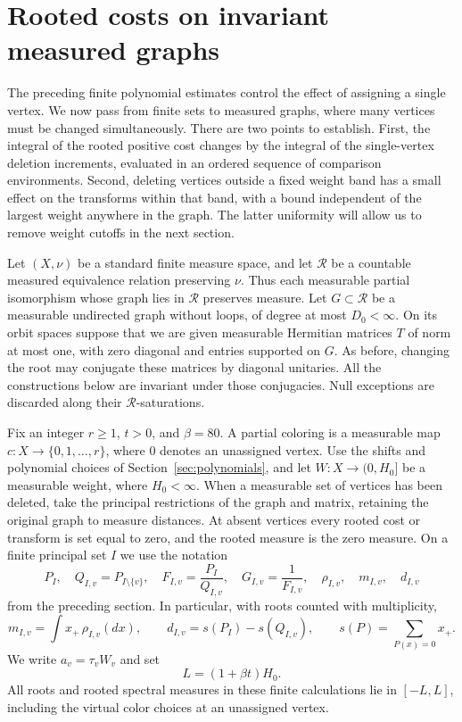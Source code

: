 \section{Rooted costs on invariant measured graphs}\label{sec:invariant}

The preceding finite polynomial estimates control the effect of assigning a
single vertex.  We now pass from finite sets to measured graphs, where many
vertices must be changed simultaneously.  There are two points to establish.
First, the integral of the rooted positive cost changes by the integral of the
single-vertex deletion increments, evaluated in an ordered sequence of
comparison environments.  Second, deleting vertices outside a fixed weight
band has a small effect on the transforms within that band, with a bound
independent of the largest weight anywhere in the graph.  The latter
uniformity will allow us to remove weight cutoffs in the next section.

Let $(X,\nu)$ be a standard finite measure space, and let $\mathcal R$ be a
countable measured equivalence relation preserving $\nu$.  Thus each
measurable partial isomorphism whose graph lies in $\mathcal R$ preserves
measure.  Let $G\subset\mathcal R$ be a measurable undirected graph without
loops, of degree at most $D_0<\infty$.  On its orbit spaces suppose that we are
given measurable Hermitian matrices $T$ of norm at most one, with zero
diagonal and entries supported on $G$.  As before, changing the root may
conjugate these matrices by diagonal unitaries.  All the constructions below
are invariant under those conjugacies.  Null exceptions are discarded along
their $\mathcal R$-saturations.

Fix an integer $r\geq1$, $t>0$, and $\beta=80$.  A partial coloring is a measurable map
$c:X\to\{0,1,\ldots,r\}$, where $0$ denotes an unassigned vertex.  Use the
shifts and polynomial choices of Section~\ref{sec:polynomials}, and let
$W:X\to(0,H_0]$ be a measurable weight, where $H_0<\infty$.  When a measurable
set of vertices has been deleted, take the principal restrictions of the
graph and matrix, retaining the original graph to measure distances.  At
absent vertices every rooted cost or transform is set equal to zero, and
the rooted measure is the zero measure.  On a
finite principal set $I$ we use the notation
\[
 P_I,\quad Q_{I,v}=P_{I\setminus\{v\}},\quad
 F_{I,v}=\frac{P_I}{Q_{I,v}},\quad G_{I,v}=\frac1{F_{I,v}},
 \quad \rho_{I,v},\quad m_{I,v},\quad d_{I,v}
\]
from the preceding section.  In particular, with roots counted with
multiplicity,
\[
 m_{I,v}=\int x_+\,\rho_{I,v}(dx),\qquad
 d_{I,v}=s(P_I)-s(Q_{I,v}),\qquad
 s(P)=\sum_{P(x)=0}x_+.
\]
We write $a_v=\tau_vW_v$ and set
\begin{equation}\label{inv:spectral-bound}
 L=(1+\beta t)H_0.
\end{equation}
All roots and rooted spectral measures in these finite calculations lie in
$[-L,L]$, including the virtual color choices at an unassigned vertex.

